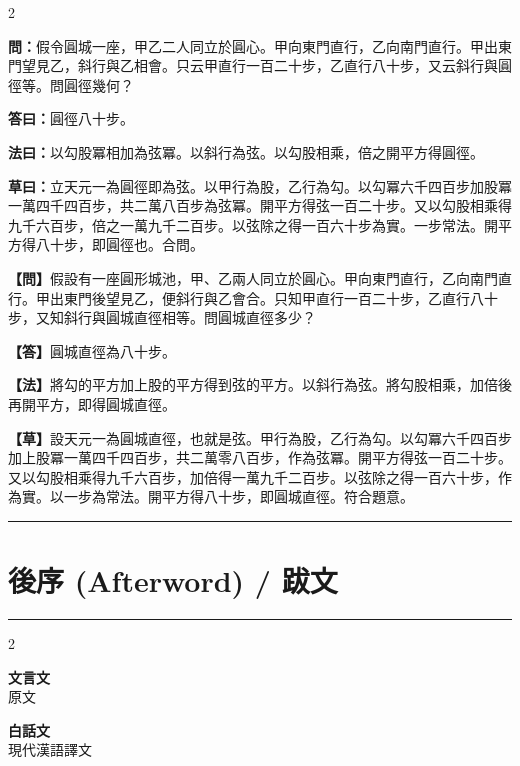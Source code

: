 \documentclass[11pt,a4paper]{article}
\newcommand{\longline}{\noindent\rule{\textwidth}{0.4pt}}
\newcommand{\wenC}[1]{\par\noindent\textbf{\textcolor{probcolor}{問：}}{#1}\par}
\newcommand{\daC}[1]{\par\noindent\textbf{\textcolor{anscolor}{答曰：}}{#1}\par}
\newcommand{\fayueC}[1]{\par\noindent\textbf{\textcolor{methodcolor}{法曰：}}{#1}\par}
\newcommand{\caoyueC}[1]{\par\noindent\textbf{草曰：}{#1}\par}
\newcommand{\wenM}[1]{\par\noindent\textbf{\textcolor{probcolor}{【問】}}{#1}\par}
\newcommand{\daM}[1]{\par\noindent\textbf{\textcolor{anscolor}{【答】}}{#1}\par}
\newcommand{\fayueM}[1]{\par\noindent\textbf{\textcolor{methodcolor}{【法】}}{#1}\par}
\newcommand{\caoyueM}[1]{\par\noindent\textbf{【草】}{#1}\par}
\newcommand{\leftlabel}{\begin{center}\textbf{\large\color{probcolor} 文言文}\\{\small 原文}\end{center}\vspace{0.3cm}}
\newcommand{\rightlabel}{\begin{center}\textbf{\large\color{methodcolor} 白話文}\\{\small 現代漢語譯文}\end{center}\vspace{0.3cm}}
\begin{document}
\begin{paracol}{2}

\wenC{假令圓城一座，甲乙二人同立於圓心。甲向東門直行，乙向南門直行。甲出東門望見乙，斜行與乙相會。只云甲直行一百二十步，乙直行八十步，又云斜行與圓徑等。問圓徑幾何？}

\daC{圓徑八十步。}

\fayueC{以勾股冪相加為弦冪。以斜行為弦。以勾股相乘，倍之開平方得圓徑。}

\caoyueC{立天元一為圓徑即為弦。以甲行為股，乙行為勾。以勾冪六千四百步加股冪一萬四千四百步，共二萬八百步為弦冪。開平方得弦一百二十步。又以勾股相乘得九千六百步，倍之一萬九千二百步。以弦除之得一百六十步為實。一步常法。開平方得八十步，即圓徑也。合問。}

\switchcolumn

\wenM{假設有一座圓形城池，甲、乙兩人同立於圓心。甲向東門直行，乙向南門直行。甲出東門後望見乙，便斜行與乙會合。只知甲直行一百二十步，乙直行八十步，又知斜行與圓城直徑相等。問圓城直徑多少？}

\daM{圓城直徑為八十步。}

\fayueM{將勾的平方加上股的平方得到弦的平方。以斜行為弦。將勾股相乘，加倍後再開平方，即得圓城直徑。}

\caoyueM{設天元一為圓城直徑，也就是弦。甲行為股，乙行為勾。以勾冪六千四百步加上股冪一萬四千四百步，共二萬零八百步，作為弦冪。開平方得弦一百二十步。又以勾股相乘得九千六百步，加倍得一萬九千二百步。以弦除之得一百六十步，作為實。以一步為常法。開平方得八十步，即圓城直徑。符合題意。}

\end{paracol}

\vspace{0.3cm}
\longline


\newpage
\section{後序 (Afterword) / 跋文}
\label{sec:afterword}

\longline

\begin{paracol}{2}
\leftlabel

\switchcolumn
\rightlabel

\end{paracol}
\end{document}
